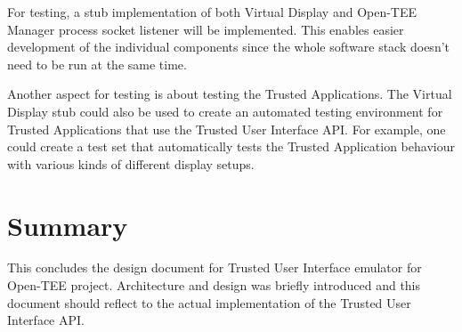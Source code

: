 \documentclass{article}
\begin{document}
For testing, a stub implementation of both Virtual Display and Open-TEE Manager
process socket listener will be implemented. This enables easier development of
the individual components since the whole software stack doesn't need to be run
at the same time.

Another aspect for testing is about testing the Trusted Applications. The
Virtual Display stub could also be used to create an automated testing
environment for Trusted Applications that use the Trusted User Interface API.
For example, one could create a test set that automatically tests the Trusted
Application behaviour with various kinds of different display setups.

\section{Summary}

This concludes the design document for Trusted User Interface emulator for
Open-TEE project. Architecture and design was briefly introduced and this
document should reflect to the actual implementation of the Trusted User
Interface API.
\end{document}
